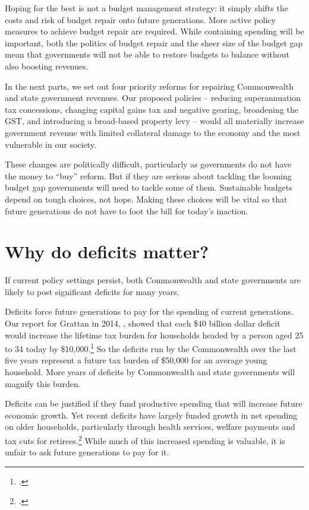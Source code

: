 \documentclass[twoside,english]{Dianab5ona4portrait}
\begin{document}
\begin{overview}[-40pt]
Hoping for the best is not a budget management strategy: it simply shifts the costs and risk of budget repair onto future generations. More active policy measures to achieve budget repair are required. While containing spending will be important, both the politics of budget repair and the sheer size of the budget gap mean that governments will not be able to restore budgets to balance without also boosting revenues.

In the next parts, we set out four priority reforms for repairing Commonwealth and state government revenues. Our proposed policies – reducing superannuation tax concessions, changing capital gains tax and negative gearing, broadening the GST, and introducing a broad-based property levy – would all materially increase government revenue with limited collateral damage to the economy and the most vulnerable in our society.

These changes are politically difficult, particularly as governments do not have the money to “buy” reform. But if they are serious about tackling the looming budget gap governments will need to tackle some of them. Sustainable budgets depend on tough choices, not hope. Making these choices will be vital so that future generations do not have to foot the bill for today’s inaction.

\end{overview}
\makeatletter\@openrightfalse
\cleardoubleevenstandardpage
\chapter{Why do deficits matter?}\label{chapter:FISCAL-1}
If current policy settings persist, both Commonwealth and state governments are likely to post significant deficits for many years. 

Deficits force future generations to pay for the spending of current generations. Our report for Grattan in 2014, , showed that each \$40 billion dollar deficit would increase the lifetime tax burden for households headed by a person aged 25 to 34 today by \$10,000.\footcite[][9]{DaleyWoodWeidmannEtAl2014} So the deficits run by the Commonwealth over the last five years represent a future tax burden of \$50,000 for an average young household. More years of deficits by Commonwealth and state governments will magnify this burden. 

Deficits can be justified if they fund productive spending that will increase future economic growth. Yet recent deficits have largely funded growth in net spending on older households, particularly through health services, welfare payments and tax cuts for retirees.\footcite[][9]{DaleyWoodWeidmannEtAl2014}  While much of this increased spending is valuable, it is unfair to ask future generations to pay for it. 
\end{document}
